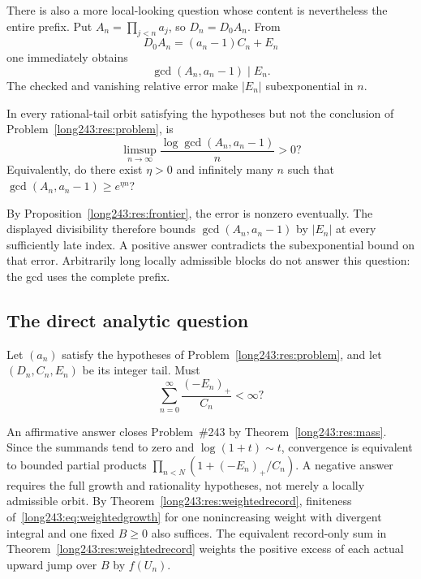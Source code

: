 \documentclass[11pt]{article}
\begin{document}
There is also a more local-looking question whose content is nevertheless the
entire prefix.  Put $A_n=\prod_{j<n}a_j$, so $D_n=D_0A_n$.  From
\[
 D_0A_n=(a_n-1)C_n+E_n
\]
one immediately obtains
\[
 \gcd(A_n,a_n-1)\mid E_n.
\]
The checked
and vanishing relative error make $|E_n|$ subexponential in $n$.

\begin{problem}\label{long243:res:prefixgcd}
In every rational-tail orbit satisfying the hypotheses but not the conclusion of Problem~\ref{long243:res:problem}, is
\[
 \limsup_{n\to\infty}
 \frac{\log\gcd(A_n,a_n-1)}{n}>0?
\]
Equivalently, do there exist $\eta>0$ and infinitely many $n$ such that
$\gcd(A_n,a_n-1)\ge e^{\eta n}$?
\end{problem}

\noindent By Proposition~\ref{long243:res:frontier}, the error is nonzero
eventually. The displayed divisibility therefore bounds
$\gcd(A_n,a_n-1)$ by $|E_n|$ at every sufficiently late index.
A positive answer contradicts the subexponential bound on that error.
Arbitrarily long locally admissible blocks do
not answer this question: the gcd uses the complete prefix.

\subsection{The direct analytic question}

\begin{problem}\label{long243:res:masshyp}
Let $(a_n)$ satisfy the hypotheses of Problem~\ref{long243:res:problem},
and let $(D_n,C_n,E_n)$ be its integer tail. Must
\[
 \sum_{n=0}^{\infty}\frac{(-E_n)_+}{C_n}<\infty ?
\]
\end{problem}

\noindent An affirmative answer closes Problem~\#243 by
Theorem~\ref{long243:res:mass}. Since the summands tend to zero and
$\log(1+t)\sim t$, convergence is equivalent to bounded partial products
$\prod_{n<N}(1+(-E_n)_+/C_n)$. A negative answer requires the full
growth and rationality hypotheses, not merely a locally admissible orbit.
By Theorem~\ref{long243:res:weightedrecord}, finiteness
of~\eqref{long243:eq:weightedgrowth} for one nonincreasing weight with
divergent integral and one fixed $B\ge0$ also suffices. The equivalent
record-only sum in Theorem~\ref{long243:res:weightedrecord} weights the
positive excess of each actual upward jump over $B$ by $f(U_n)$.
\end{document}
